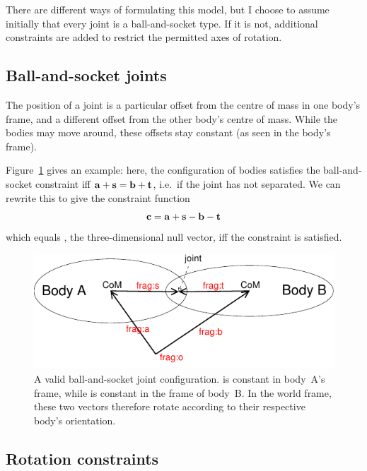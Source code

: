 There are different ways of formulating this model, but I choose to assume initially that every
joint is a ball-and-socket type. If it is not, additional constraints are added to restrict
the permitted axes of rotation.

\subsection{Ball-and-socket joints}

The position of a joint is a particular offset from the centre of mass in one body's frame, and a
different offset from the other body's centre of mass. While the bodies may move around, these
offsets stay constant (as seen in the body's frame).

Figure~\ref{ballAndSocketFigure} gives an example: here, the configuration of bodies satisfies the
ball-and-socket constraint iff $\ve{a}+\ve{s} = \ve{b}+\ve{t}$, i.e.\ if the joint has not
separated. We can rewrite this to give the constraint function
\begin{equation}
\ve{c} = \ve{a} + \ve{s} - \ve{b} - \ve{t}
\end{equation}
which equals , the three-dimensional null vector, iff the constraint is satisfied.

\begin{figure}
\centerline{\includegraphics{figures/joint2}}
\caption[]{A valid ball-and-socket joint configuration.  is constant in body~A's frame,
    while  is constant in the frame of body~B. In the world frame, these two vectors
    therefore rotate according to their respective body's orientation.\label{ballAndSocketFigure}}
\end{figure}

\subsection{Rotation constraints}

